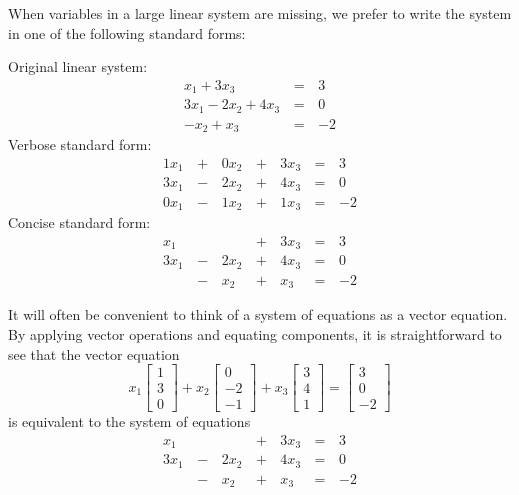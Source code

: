 \begin{remark}
  When variables in a large linear system are missing, we prefer to
  write the system in one of the following standard forms:

  \begin{multicols}{3}\noindent
    Original linear system:
    \begin{alignat*}{2}
       x_1 + 3x_3 &\,=\,& 3 \\
      3x_1 - 2x_2 + 4x_3 &\,=\,& 0 \\
      -x_2 +  x_3 &\,=\,& -2
    \end{alignat*}
    Verbose standard form:
    \begin{alignat*}{4}
      1x_1 &\,+\,& 0x_2 &\,+\,& 3x_3 &\,=\,& 3 \\
      3x_1 &\,-\,& 2x_2 &\,+\,& 4x_3 &\,=\,& 0 \\
      0x_1 &\,-\,& 1x_2 &\,+\,& 1x_3 &\,=\,& -2
    \end{alignat*}
    Concise standard form:
    \begin{alignat*}{4}
       x_1 &     &      &\,+\,& 3x_3 &\,=\,& 3 \\
      3x_1 &\,-\,& 2x_2 &\,+\,& 4x_3 &\,=\,& 0 \\
           &\,-\,&  x_2 &\,+\,&  x_3 &\,=\,& -2
    \end{alignat*}
  \end{multicols}
\end{remark}

\begin{remark}
It will often be convenient to think of a system of equations as a vector equation.
\vfill
By applying vector operations and equating components, it is straightforward to see that the vector equation
\[ x_1 \begin{bmatrix} 1 \\ 3 \\ 0 \end{bmatrix}+ x_2 \begin{bmatrix} 0 \\ -2 \\ -1 \end{bmatrix} + x_3 \begin{bmatrix} 3 \\ 4 \\1 \end{bmatrix} = \begin{bmatrix} 3 \\ 0 \\ -2 \end{bmatrix}\]
is equivalent to the system of equations
\begin{alignat*}{4}
   x_1 &     &      &\,+\,& 3x_3 &\,=\,& 3 \\
  3x_1 &\,-\,& 2x_2 &\,+\,& 4x_3 &\,=\,& 0 \\
       &\,-\,&  x_2 &\,+\,&  x_3 &\,=\,& -2
\end{alignat*}
\end{remark}


